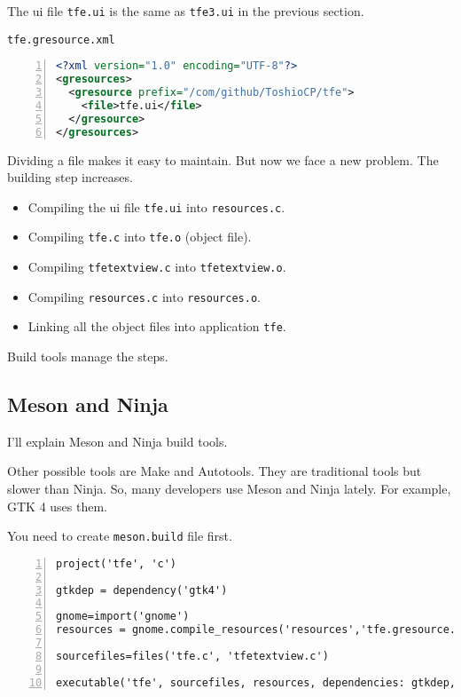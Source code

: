 The ui file \passthrough{\lstinline!tfe.ui!} is the same as
\passthrough{\lstinline!tfe3.ui!} in the previous section.

\passthrough{\lstinline!tfe.gresource.xml!}

\begin{lstlisting}[language=XML, numbers=left]
<?xml version="1.0" encoding="UTF-8"?>
<gresources>
  <gresource prefix="/com/github/ToshioCP/tfe">
    <file>tfe.ui</file>
  </gresource>
</gresources>
\end{lstlisting}

Dividing a file makes it easy to maintain. But now we face a new
problem. The building step increases.

\begin{itemize}
\tightlist
\item
  Compiling the ui file \passthrough{\lstinline!tfe.ui!} into
  \passthrough{\lstinline!resources.c!}.
\item
  Compiling \passthrough{\lstinline!tfe.c!} into
  \passthrough{\lstinline!tfe.o!} (object file).
\item
  Compiling \passthrough{\lstinline!tfetextview.c!} into
  \passthrough{\lstinline!tfetextview.o!}.
\item
  Compiling \passthrough{\lstinline!resources.c!} into
  \passthrough{\lstinline!resources.o!}.
\item
  Linking all the object files into application
  \passthrough{\lstinline!tfe!}.
\end{itemize}

Build tools manage the steps.

\subsection{Meson and Ninja}\label{meson-and-ninja}

I'll explain Meson and Ninja build tools.

Other possible tools are Make and Autotools. They are traditional tools
but slower than Ninja. So, many developers use Meson and Ninja lately.
For example, GTK 4 uses them.

You need to create \passthrough{\lstinline!meson.build!} file first.

\begin{lstlisting}[numbers=left]
project('tfe', 'c')

gtkdep = dependency('gtk4')

gnome=import('gnome')
resources = gnome.compile_resources('resources','tfe.gresource.xml')

sourcefiles=files('tfe.c', 'tfetextview.c')

executable('tfe', sourcefiles, resources, dependencies: gtkdep, install: false)
\end{lstlisting}

